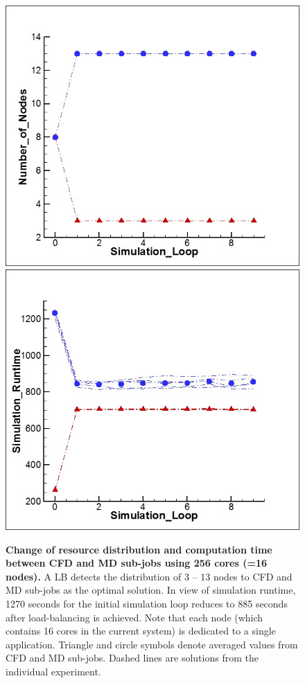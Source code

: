 \documentclass[preprint,12pt]{elsarticle}
\begin{document}
\begin{figure}
\centering
\includegraphics[width=0.3\linewidth]{256_Node.jpg}
\includegraphics[width=0.3\linewidth]{256_Time.jpg}
\caption{\small {\bf Change of resource distribution and computation time
between CFD and MD sub-jobs using 256 cores (=16 nodes).} A LB detects
the distribution of 3 -- 13 nodes to CFD and MD sub-jobs as the optimal solution. In view of
 simulation runtime, 1270 seconds for the initial simulation loop reduces to
885 seconds after load-balancing is achieved. Note that each node
(which contains 16 cores in the current system) is dedicated to a single
application. Triangle and circle symbols denote averaged values from CFD
and MD sub-jobs. Dashed lines are solutions from the individual experiment.
}
\label{Fig:LBSmall}
\vspace{-1em}
\end{figure}

\end{document}
